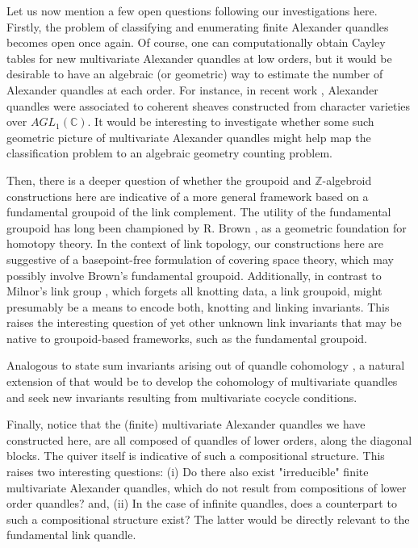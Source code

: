 \documentclass[a4paper,12pt]{article}
\newcommand{\Z}{\mathbb{Z}}
\begin{document}
Let us now mention a few open questions following our investigations here. Firstly, the problem of classifying and enumerating finite Alexander quandles becomes open once again. Of course, one can computationally obtain Cayley tables for new multivariate Alexander quandles at low orders, but it would be desirable to have an algebraic (or geometric) way to estimate the number of Alexander quandles at each order. For instance, in recent work \cite{gonzalez2025representations}, Alexander quandles were associated to coherent sheaves constructed from character  varieties over $AGL_1({\mathbb C})$. It would be interesting to investigate whether some such geometric picture of multivariate Alexander quandles might help map the classification problem to an algebraic geometry counting problem.

Then, there is a deeper question of whether the groupoid and $\Z$-algebroid constructions here are indicative of a more general framework based on a   fundamental groupoid of the link complement. The utility of the fundamental groupoid has long been championed by R. Brown \cite{brown1987groups, brown2006topology}, as a geometric foundation for homotopy theory. In the context of link topology, our constructions here are suggestive of a basepoint-free formulation of covering space theory, which may possibly involve Brown's fundamental groupoid.  Additionally, in contrast to Milnor's link group \cite{milnor1954link}, which forgets all knotting data, a link groupoid, might presumably be a means to encode both, knotting and linking invariants.  This raises the interesting question of yet other unknown link invariants that may be  native to groupoid-based frameworks, such as the fundamental groupoid. 


 Analogous to state sum invariants arising out of quandle cohomology \cite{carter2003quandle}, a natural extension of that would be to develop the cohomology of multivariate quandles and seek new invariants resulting from multivariate cocycle conditions. 

Finally, notice that the (finite) multivariate Alexander quandles we have constructed here, are all composed of quandles of lower orders, along the  diagonal blocks. The quiver itself is indicative of such a compositional structure. This raises two interesting questions: (i) Do there also exist "irreducible" finite multivariate Alexander quandles, which do not result from compositions of lower order quandles? and, (ii) In the case of infinite quandles, does a counterpart to such a compositional structure exist? The latter would be directly relevant to the fundamental link quandle.    









\end{document}
